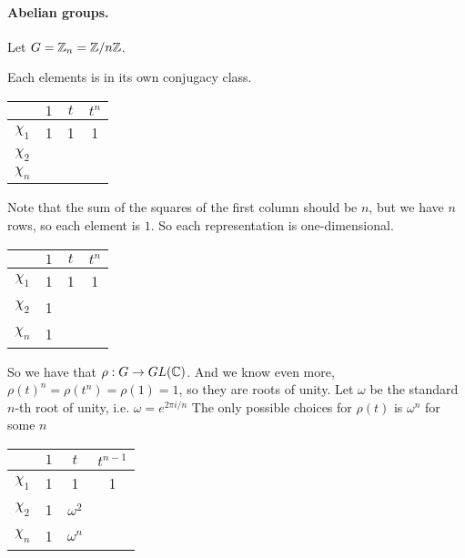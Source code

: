 
\paragraph{Abelian groups.}

Let $G = \mathbb{Z}_n = \mathbb{Z} / n \mathbb{Z}$.

Each elements is in its own conjugacy class.

\begin{center}
\begin{tabular}{cccc}
     & $1$ &  $t$ &  $t^{n}$\\ \hline
    $\chi_{1}$ & 1& 1&1\\
    $\chi_{2}$ &  &  & \\
    $\chi_{n}$ &  &  & \\
\end{tabular}
\end{center}

Note that the sum of the squares of the first column should be $n$, but we have  $n$ rows, so each element is  $1$. So each representation is one-dimensional.

\begin{center}\begin{tabular}{cccc}
     & $1$ &  $t$ &  $t^{n}$\\ \hline
    $\chi_{1}$ & 1& 1&1\\
    $\chi_{2}$ & 1 &  & \\
    $\chi_{n}$ & 1 &  & \\
\end{tabular}\end{center}

So we have that $\rho: G \to  GL(\mathbb{C})$.
And we know even more, $\rho(t)^{n} = \rho(t^{n}) = \rho(1) = 1$, so they are roots of unity.
Let $\omega$ be the standard $n$-th root of unity, i.e. $\omega = e^{ 2 \pi i / n }$
The only possible choices for $\rho(t)$ is  $\omega^{n}$ for some $n$

\begin{center}\begin{tabular}{cccc}
     & $1$ &  $t$ &  $t^{n-1}$\\ \hline
    $\chi_{1}$ & 1& 1&1\\
    $\chi_{2}$ & 1 & $\omega^{2}$ & \\
    $\chi_{n}$ & 1 & $\omega^{n}$ & \\
\end{tabular}\end{center}

